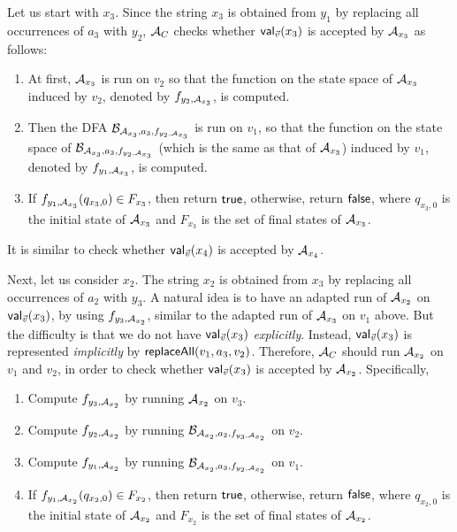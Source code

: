 \documentclass{llncs}
\begin{document}
Let us start with $x_3$. Since the string $x_3$ is obtained from $y_1$ by replacing all occurrences of $a_3$ with $y_2$, $\mathcal{A}_C$ checks whether $\mathsf{val}_{\vec{v}}(x_3)$ is accepted by $\mathcal{A}_{x_3}$ as follows: 
\begin{enumerate}
\item At first, $\mathcal{A}_{x_3}$ is run on $v_2$ so that 
 the function on the state space of $\mathcal{A}_{x_3}$ induced by $v_2$, denoted by $f_{y_2,\mathcal{A}_{x_3}}$, is computed. 
%
 \item Then the DFA $\mathcal{B}_{\mathcal{A}_{x_3}, a_3, f_{y_2,\mathcal{A}_{x_3}}}$ is run on $v_1$, so that  the function on the state space of $\mathcal{B}_{\mathcal{A}_{x_3}, a_3, f_{y_2,\mathcal{A}_{x_3}}}$ (which is the same as that of $\mathcal{A}_{x_3}$) induced by $v_1$, denoted by $f_{y_1, \mathcal{A}_{x_3}}$, is computed.
%
 \item If $f_{y_1, \mathcal{A}_{x_3}}(q_{x_3,0}) \in F_{x_3}$, then return ${\sf true}$, otherwise, return ${\sf false}$, where $q_{x_3,0}$ is the initial state of $\mathcal{A}_{x_3}$ and $F_{x_3}$ is the set of final states of $\mathcal{A}_{x_3}$.
\end{enumerate}
It is similar to check  whether $\mathsf{val}_{\vec{v}}(x_4)$ is accepted by $\mathcal{A}_{x_4}$.

Next, let us consider $x_2$. The string $x_2$ is obtained from $x_3$ by replacing all occurrences of $a_2$ with $y_3$. A natural idea is to have an adapted run of $\mathcal{A}_{x_2}$ on $\mathsf{val}_{\vec{v}}(x_3)$, by using $f_{y_3, \mathcal{A}_{x_2}}$, similar to the adapted run of $\mathcal{A}_{x_3}$ on $v_1$ above.
But the difficulty is that we do not have $\mathsf{val}_{\vec{v}}(x_3)$ \emph{explicitly}. Instead, $\mathsf{val}_{\vec{v}}(x_3)$ is represented \emph{implicitly} by $\mathsf{replaceAll}(v_1,a_3, v_2)$. Therefore, $\mathcal{A}_C$ should run $\mathcal{A}_{x_2}$ on $v_1$ and $v_2$, in order to check whether $\mathsf{val}_{\vec{v}}(x_3)$ is accepted by $\mathcal{A}_{x_2}$. Specifically, 
\begin{enumerate}
\item Compute $f_{y_3, \mathcal{A}_{x_2}}$ by running $\mathcal{A}_{x_2}$ on $v_3$.
%
\item Compute $f_{y_2, \mathcal{A}_{x_2}}$ by running $\mathcal{B}_{\mathcal{A}_{x_2}, a_2, f_{y_3, \mathcal{A}_{x_2}}}$ on $v_2$.
%
\item Compute $f_{y_1, \mathcal{A}_{x_2}}$ by running $\mathcal{B}_{\mathcal{A}_{x_2}, a_3, f_{y_2, \mathcal{A}_{x_2}}}$ on $v_1$.
%
 \item If $f_{y_1, \mathcal{A}_{x_2}}(q_{x_2,0}) \in F_{x_2}$, then return ${\sf true}$, otherwise, return ${\sf false}$, where $q_{x_2,0}$ is the initial state of $\mathcal{A}_{x_2}$ and $F_{x_2}$ is the set of final states of $\mathcal{A}_{x_2}$.
\end{enumerate}
\end{document}
